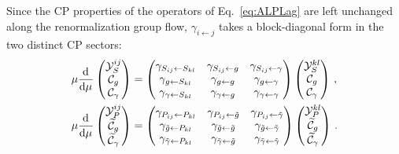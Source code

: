 Since the CP properties of the operators of Eq.~\eqref{eq:ALPLag} are left unchanged along the
renormalization group flow, $\gamma_{i \leftarrow j}$ takes a block-diagonal form in the two
distinct CP sectors:
\begin{align}
\mu\dv[]{}{\mu}
    \begin{pmatrix}
        \mathcal Y_S^{ij} \\ \mathcal C_g \\  \mathcal C_\gamma
    \end{pmatrix}
    &=
    \begin{pmatrix}
        \gamma_{S_{ij} \leftarrow S_{kl}} & \gamma_{S_{ij} \leftarrow g} & \gamma_{S_{ij} \leftarrow \gamma}\\
        \gamma_{g \leftarrow S_{kl}} & \gamma_{g \leftarrow g} & \gamma_{g \leftarrow \gamma} \\
        \gamma_{\gamma \leftarrow S_{kl}} & \gamma_{\gamma \leftarrow g} & \gamma_{\gamma \leftarrow \gamma}
    \end{pmatrix}
    \begin{pmatrix}
        \mathcal Y_S^{kl}\\ \mathcal C_g \\ \mathcal C_\gamma
    \end{pmatrix} \,,
    \label{eq:ALPADMeven}
    \\
    \mu\dv[]{}{\mu}
    \begin{pmatrix}
         \mathcal Y_P^{ij}\\\widetilde{\mathcal C}_g \\ \widetilde{\mathcal C}_\gamma
    \end{pmatrix}
    &=
    \begin{pmatrix}
        \gamma_{P_{ij} \leftarrow P_{kl}} & \gamma_{P_{ij} \leftarrow \tilde g} & \gamma_{P_{ij} \leftarrow \tilde \gamma}\\
        \gamma_{\tilde g \leftarrow P_{kl}} & \gamma_{\tilde g \leftarrow \tilde g} & \gamma_{\tilde g \leftarrow \tilde \gamma} \\
        \gamma_{\tilde \gamma \leftarrow P_{kl}} & \gamma_{\tilde \gamma \leftarrow \tilde g} & \gamma_{\tilde\gamma \leftarrow \tilde \gamma}
    \end{pmatrix}
    \begin{pmatrix}\mathcal Y_P^{kl}\\
\widetilde{\mathcal C}_g \\ \widetilde{\mathcal C}_\gamma
\end{pmatrix}\,.
    \label{eq:ALPADModd}
\end{align}

